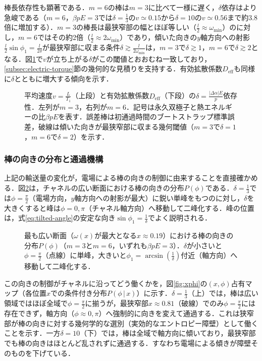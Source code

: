\documentclass[dvipdfmx]{ampbt}
\begin{document}
  棒長依存性も顕著である．$m=6$の棒は$m=3$に比べて一様に遅く，$\delta$依存はより急峻である（$m=6$，$\beta pE=3$では$\delta=\frac{1}{3}$の$v\simeq0.15$から$\delta=10$の$v\simeq0.56$まで約3.8倍に増加する）．$m=3$の棒長は最狭窄部の幅とほぼ等しい（$\frac{l}{2}\approx\omega_{\min}$）のに対し，$m=6$ではその約2倍（$\frac{l}{2}\approx2\omega_{\min}$）であり，傾いた向きの$y$軸方向への射影$\frac{l}{2}\sin\phi_1=\frac{l}{2\delta}$が最狭窄部に収まる条件$\delta\gtrsim\frac{l}{2\omega_{\min}}$は，$m=3$で$\delta\gtrsim1$，$m=6$で$\delta\gtrsim2$となる．図\ref{fig:transport}で$v$が立ち上がる$\delta$がこの閾値とおおむね一致しており，\ref{subsec:electric-torque}節の幾何的な見積りを支持する．有効拡散係数$D_{\mathrm{eff}}$も同様に$\delta$とともに増大する傾向を示す．

  \begin{figure}[H]
    \centering
    
    \caption{平均速度$v=\frac{L}{T_1}$（上段）と有効拡散係数$D_{\mathrm{eff}}$（下段）の$\delta=\frac{|\Delta\alpha|E}{p}$依存性．左列が$m=3$，右列が$m=6$．記号は永久双極子と熱エネルギーの比$\beta pE$を表す．誤差棒は初通過時間のブートストラップ標準誤差，破線は傾いた向きが最狭窄部に収まる幾何閾値（$m=3$で$\delta=1$，$m=6$で$\delta=2$）を示す．}
    \label{fig:transport}
  \end{figure}

  \subsubsection{棒の向きの分布と通過機構}
  上記の輸送量の変化が，電場による棒の向きの制御に由来することを直接確かめる．図\ref{fig:pphi}は，チャネルの広い断面における棒の向きの分布$P(\phi)$である．$\delta=\frac{1}{3}$では$\phi=\frac{\pi}{2}$（電場方向，$y$軸方向への射影が最大）に鋭い単峰をもつのに対し，$\delta$を大きくすると峰は$\phi=0,\pi$（チャネル軸方向）へ移動して二峰化する．峰の位置は，式\eqref{eq:tilted-angle}の安定な向き$\sin\phi_1=\frac{1}{\delta}$でよく説明される．

  \begin{figure}[H]
    \centering
    
    \caption{最も広い断面（$\omega(x)$が最大となる$x\approx0.19$）における棒の向きの分布$P(\phi)$（$m=3$と$m=6$，いずれも$\beta pE=3$）．$\delta$が小さいと$\phi=\frac{\pi}{2}$（点線）に単峰，大きいと$\phi_1=\arcsin(\frac{1}{\delta})$付近（軸方向）へ移動して二峰化する．}
    \label{fig:pphi}
  \end{figure}

  この向きの制御がチャネルに沿ってどう働くかを，図\ref{fig:xphi}の$(x,\phi)$占有マップ（各位置$x$での条件付き分布$P(\phi\,|\,x)$）に示す．$\delta=\frac{1}{3}$（上）では，棒は広い領域ではほぼ全域で$\phi=\frac{\pi}{2}$に揃うが，最狭窄部$x\approx0.81$（破線）でのみ$\phi=\frac{\pi}{2}$には存在できず，軸方向（$\phi\approx0,\pi$）へ強制的に向きを変えて通過する．これは狭窄部が棒の向きに対する幾何学的な選別（実効的なエントロピー障壁）として働くことを示す．一方$\delta=10$（下）では，棒は全域で軸方向に傾いており，最狭窄部でも棒の向きはほとんど乱されずに通過する．すなわち電場による傾きが障壁そのものを下げている．
\end{document}
